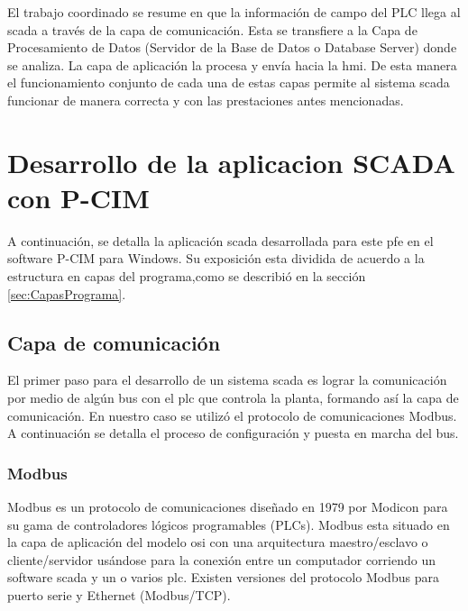 El trabajo coordinado se resume en que la información de campo del PLC llega al \gls{scada} a 
través de la capa de comunicación. Esta se transfiere a la Capa de Procesamiento de Datos (Servidor 
de la Base de Datos o Database Server) donde se analiza. La capa de aplicación la procesa y envía 
hacia la \gls{hmi}. De esta manera el funcionamiento conjunto de cada una de estas capas permite 
al sistema \gls{scada} funcionar de manera correcta y con las prestaciones antes mencionadas.


\section{Desarrollo de la aplicacion SCADA con P-CIM}

A continuación, se detalla la aplicación \gls{scada} desarrollada para este \gls{pfe} en el software
P-CIM para Windows. Su exposición esta dividida de acuerdo a la estructura en capas del programa,como 
se describió en la sección \ref{sec:CapasPrograma}.

\subsection{Capa de comunicación}
\label{subsec:CapaComunicacion}

El primer paso para el desarrollo de un sistema \gls{scada} es lograr la comunicación por medio
de algún bus con el \gls{plc} que controla la planta, formando así la capa de comunicación. 
En nuestro caso se utilizó el protocolo de comunicaciones Modbus. A continuación se detalla el 
proceso de configuración y puesta en marcha del bus. 

\subsubsection{Modbus}
Modbus es un protocolo de comunicaciones diseñado en 1979 por Modicon para su gama de 
controladores lógicos programables (PLCs). Modbus esta situado en la capa de aplicación 
del modelo \gls{osi} con una arquitectura maestro/esclavo o cliente/servidor usándose 
para la conexión entre un computador corriendo un software \gls{scada} y un o varios 
\gls{plc}. Existen versiones del protocolo Modbus para puerto serie y Ethernet (Modbus/TCP).

